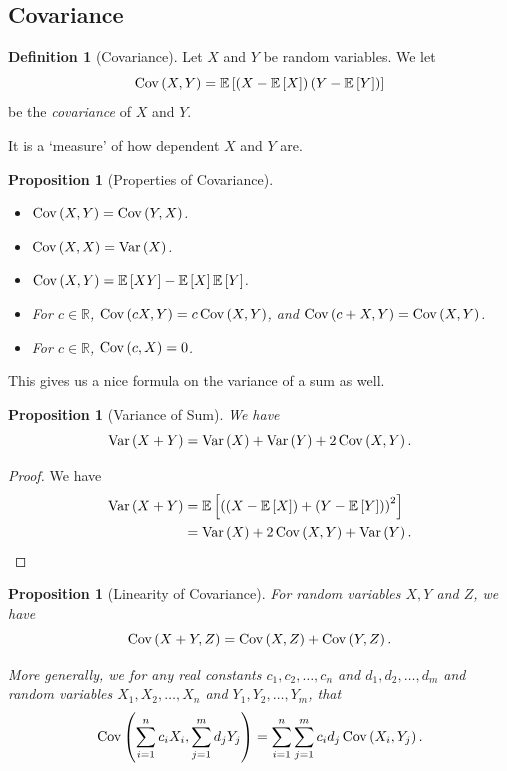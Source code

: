 \documentclass{article}
\newtheorem{proposition}[theorem]{Proposition}
\theoremstyle{definition}
\newtheorem{definition}[theorem]{Definition}
\theoremstyle{remark}
\newcommand{\RR}{\mathbb{R}}
\newcommand{\Expt}{\mathbb{E}}
\newcommand{\Var}{\operatorname{Var}}
\newcommand{\Cov}{\operatorname{Cov}}
\begin{document}
\subsection{Covariance}

\begin{definition}[Covariance]
    \label{def:covariance}%
    Let \(X\) and \(Y\) be random variables. We let
    \[
        \Cov\pqty{X, Y} = \Expt\bqty{\pqty{X - \Expt\bqty{X}} \pqty{Y - \Expt\bqty{Y}}}
    \]
    be the \emph{covariance} of \(X\) and \(Y\).
\end{definition}

It is a `measure' of how dependent \(X\) and \(Y\) are.

\begin{proposition}[Properties of Covariance]
    \label{prop:properties-of-covariance}%
    \begin{itemize}
        \item \(\Cov\pqty{X, Y} = \Cov\pqty{Y, X}\). 
        \item \(\Cov\pqty{X, X} = \Var\pqty{X}\).
        \item \(\Cov\pqty{X, Y} = \Expt\bqty{X Y} - \Expt\bqty{X} \Expt\bqty{Y}\).
        \item For \(c \in \RR\), \(\Cov\pqty{cX, Y} = c \Cov\pqty{X, Y}\), and \(\Cov\pqty{c + X, Y} = \Cov\pqty{X, Y}\).
        \item For \(c \in \RR\), \(\Cov\pqty{c, X} = 0\).
    \end{itemize}
\end{proposition}

This gives us a nice formula on the variance of a sum as well.

\begin{proposition}[Variance of Sum]
    \label{prop:variance-of-sum}%
    We have
    \[
        \Var\pqty{X + Y} = \Var\pqty{X} + \Var\pqty{Y} + 2 \Cov\pqty{X, Y}.
    \]    
\end{proposition}

\begin{proof}
    We have
    \begin{align*}
        \Var\pqty{X + Y} &= \Expt\bqty{\pqty{\pqty{X - \Expt\bqty{X}} + \pqty{Y - \Expt\bqty{Y}}}^2} \\
        &= \Var\pqty{X} + 2 \Cov\pqty{X, Y} + \Var\pqty{Y}.
    \end{align*}
\end{proof}

\begin{proposition}[Linearity of Covariance]
    \label{prop:linearity-of-covariance}%
    For random variables \(X, Y\) and \(Z\), we have
    \[
        \Cov\pqty{X + Y, Z} = \Cov\pqty{X, Z} + \Cov\pqty{Y, Z}.
    \]

    More generally, we for any real constants  \(c_1, c_2, \ldots, c_n\) and \(d_1, d_2, \ldots, d_m\) and random variables \(X_1, X_2, \ldots, X_n\) and \(Y_1, Y_2, \ldots, Y_m\), that
    \[
        \Cov\pqty{\sum_{i = 1}^{n} c_i X_i, \sum_{j = 1}^{m} d_j Y_j} = \sum_{i = 1}^{n} \sum_{j = 1}^{m} c_i d_j \Cov\pqty{X_i, Y_j}.
    \]
\end{proposition}
\end{document}

